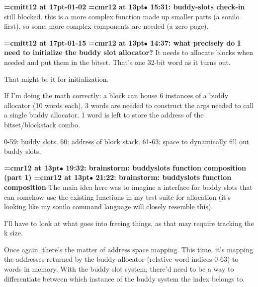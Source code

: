 {\medskip\noindent\bf\font\titlefont=cmitt12 at 17pt-01-02}\medskip
{\smallskip\noindent\bf\font\titlefont=cmr12 at 13pt\titlefont $\bullet$ 15:31: buddy-slots check-in}\smallskip
still blocked. this is a more complex function made up smaller parts (a sonilo first), so some more complex components are needed (a zero page).
\par

{\medskip\noindent\bf\font\titlefont=cmitt12 at 17pt-01-15}\medskip
{\smallskip\noindent\bf\font\titlefont=cmr12 at 13pt\titlefont $\bullet$ 14:37: what precisely do I need to initialize the buddy slot allocator?}\smallskip
It needs to allocate blocks when needed and put them in the bitset. That's one 32-bit word as it turns out.
\par

That might be it for initialization.
\par

If I'm doing the math correctly: a block can house 6 instances of a buddy allocator (10 words each), 3 words are needed to construct the args needed to call a single buddy allocator. 1 word is left to store the address of the bitset/blockstack combo.
\par

0-59: buddy slots. 60: address of block stack. 61-63: space to dynamically fill out buddy slots.
\par

{\smallskip\noindent\bf\font\titlefont=cmr12 at 13pt\titlefont $\bullet$ 19:32: brainstorm: buddyslots function composition (part 1)}\smallskip
{\smallskip\noindent\bf\font\titlefont=cmr12 at 13pt\titlefont $\bullet$ 21:22: brainstorm: buddyslots function composition}\smallskip
The main idea here was to imagine a interface for buddy slots that can somehow use the existing functions in my test suite for allocation (it's looking like my sonilo command language will closely resemble this).
\par

I'll have to look at what goes into freeing things, as that may require tracking the k size.
\par

Once again, there's the matter of address space mapping. This time, it's mapping the addresses returned by the buddy allocator (relative word indices 0-63) to words in memory. With the buddy slot system, there'd need to be a way to differentiate between which instance of the buddy system the index belongs to.
\par

